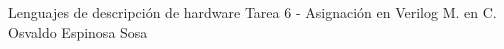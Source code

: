 




	\pnormal
	{Lenguajes de descripción de hardware}
	{Tarea 6 - Asignación en Verilog}
	{M. en C. Osvaldo Espinosa Sosa}
	\tableofcontents
	
	\newpage 
	\newpage 
	\clearpage 
	\clearpage 
	\clearpage 
	\newpage 



